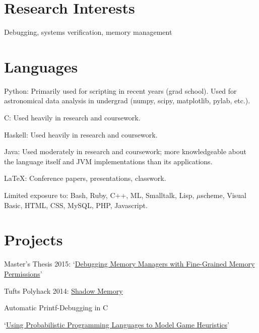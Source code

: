 \documentclass[margin,line]{res}                          %
\newenvironment{list1}{
  \begin{list}{\ding{113}}{%
      \setlength{\itemsep}{0in}
      \setlength{\parsep}{0in} \setlength{\parskip}{0in}
      \setlength{\topsep}{0in} \setlength{\partopsep}{0in}
      \setlength{\leftmargin}{0.17in}}}{\end{list}}
\begin{document}
\begin{resume}
\section{\sc Research Interests}
Debugging, systems verification, memory management

\section{\sc Languages}
\begin{list1}
\item[] Python: Primarily used for scripting in recent years (grad school). Used for astronomical
        data analysis in undergrad (numpy, scipy, matplotlib, pylab, etc.). \\
\item[] C: Used heavily in research and coursework. \\
\item[] Haskell: Used heavily in research and coursework. \\
\item[] Java: Used moderately in research and coursework; more knowledgeable about the language
        itself and JVM implementations than its applications. \\
\item[] \LaTeX: Conference papers, presentations, classwork. \\
\item[] Limited exposure to: Bash, Ruby, C++, ML, Smalltalk, Lisp, $\mu$scheme, Visual Basic,
        HTML, CSS, MySQL, PHP, Javascript.
\end{list1}

\section{\sc Projects}
\begin{list1}
\item[] Master's Thesis 2015: `\href{https://www.eecs.tufts.edu/~karl/masters/}{Debugging Memory Managers with Fine-Grained Memory Permissions}' \\
\item[] Tufts Polyhack 2014: \href{https://github.com/cronburg/shadow-memory/}{Shadow Memory}
\item[] Automatic Printf-Debugging in C
\item[] `\href{https://www.eecs.tufts.edu/~karl/ppl/}{Using Probabilistic Programming Languages to Model Game Heuristics}'
\item[] 
\end{list1}


\end{resume}
\end{document}
